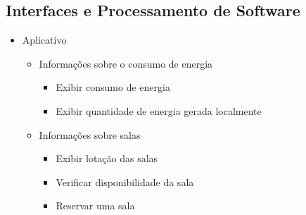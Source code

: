 \begin{apendicesenv}
\section{Interfaces e Processamento de Software}

  \begin{itemize}
    \item Aplicativo
      \begin{itemize}
        \item Informações sobre o consumo de energia
        \begin{itemize}
        \item Exibir consumo de energia
        \item Exibir quantidade de energia gerada localmente
      \end{itemize}
        \item Informações sobre salas
        \begin{itemize}
        \item Exibir lotação das salas
        \item Verificar disponibilidade da sala
        \item Reservar uma sala
      \end{itemize}
         

\end{itemize}
\end{itemize}
\end{apendicesenv}
